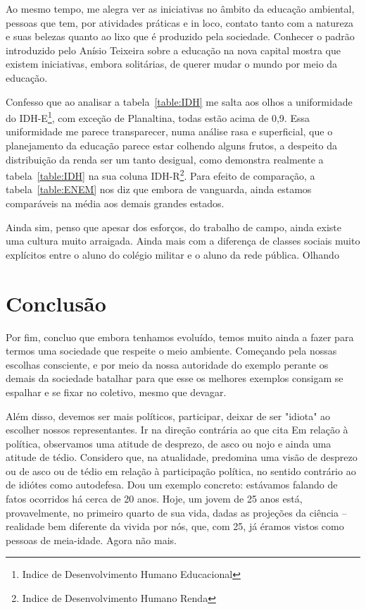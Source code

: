 Ao mesmo tempo, me alegra ver as iniciativas no âmbito da educação ambiental, pessoas que tem, por atividades práticas e in loco, contato tanto com a natureza e suas belezas quanto ao lixo que é produzido pela sociedade.
Conhecer o padrão introduzido pelo Anísio Teixeira sobre a educação na nova capital mostra que existem iniciativas, embora solitárias, de querer mudar o mundo por meio da educação.

Confesso que ao analisar a tabela~\ref{table:IDH} me salta aos olhos a uniformidade do IDH-E\footnote{Indice de Desenvolvimento Humano Educacional}, com exceção de Planaltina, todas estão acima de 0,9.
Essa uniformidade me parece transparecer, numa análise rasa e superficial, que o planejamento da educação parece estar colhendo alguns frutos, a despeito da distribuição da renda ser um tanto desigual, como demonstra realmente a tabela~\ref{table:IDH} na sua coluna IDH-R\footnote{Indice de Desenvolvimento Humano Renda}.
Para efeito de comparação, a tabela~\ref{table:ENEM} nos diz que embora de vanguarda, ainda estamos comparáveis na média aos demais grandes estados.

Ainda sim, penso que apesar dos esforços, do trabalho de campo, ainda existe uma cultura muito arraigada. Ainda mais com a diferença de classes sociais muito explícitos entre o aluno do colégio militar e o aluno da rede pública. Olhando



\section{Conclusão}

Por fim, concluo que embora tenhamos evoluído, temos muito ainda a fazer para termos uma sociedade que respeite o meio ambiente. Começando pela nossas escolhas consciente, e por meio da nossa autoridade do exemplo perante os demais da sociedade batalhar para que esse os melhores exemplos consigam se espalhar e se fixar no coletivo, mesmo que devagar.

Além disso, devemos ser mais políticos, participar, deixar de ser "idiota" ao escolher nossos representantes. Ir na direção contrária ao que cita  Em relação à
política, observamos uma atitude de desprezo, de asco ou nojo e ainda uma
atitude de tédio. Considero que, na atualidade, predomina uma visão de
desprezo ou de asco ou de tédio em relação à participação política, no sentido
contrário ao de idiótes como autodefesa. Dou um exemplo concreto: estávamos
falando de fatos ocorridos há cerca de 20 anos. Hoje, um jovem de 25 anos
está, provavelmente, no primeiro quarto de sua vida, dadas as projeções da
ciência – realidade bem diferente da vivida por nós, que, com 25, já éramos
vistos como pessoas de meia-idade. Agora não mais.

